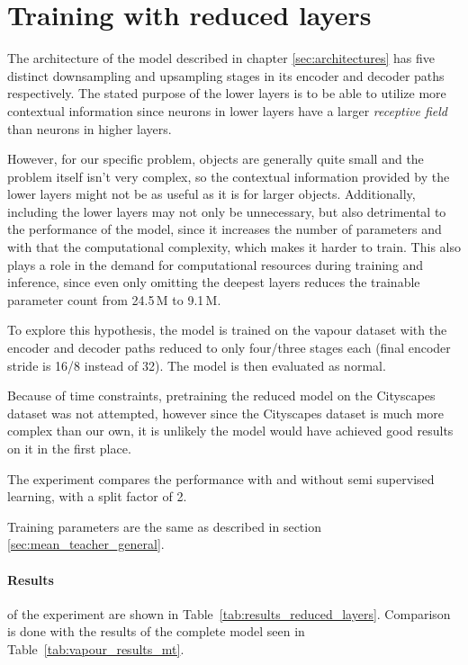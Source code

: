 \section{Training with reduced layers}
\label{sec:reduced_layers}

The architecture of the model described in chapter \ref{sec:architectures} has five distinct downsampling and upsampling stages in its encoder and decoder paths respectively.
The stated purpose of the lower layers is to be able to utilize more contextual information since neurons in lower layers have a larger \emph{receptive field} than neurons in higher layers.

However, for our specific problem, objects are generally quite small  and the problem itself isn't very complex, so the contextual information provided by the lower layers might not be as useful as it is for larger objects.
Additionally, including the lower layers may not only be unnecessary, but also detrimental to the performance of the model, since it increases the number of parameters and with that the computational complexity, which makes it harder to train. 
This also plays a role in the demand for computational resources during training and inference, since even only omitting the deepest layers reduces the trainable parameter count from 24.5\,M to 9.1\,M.

To explore this hypothesis, the model is trained on the vapour dataset with the encoder and decoder paths reduced to only four/three stages each (final encoder stride is 16/8 instead of 32). The model is then evaluated as normal.

Because of time constraints, pretraining the reduced model on the Cityscapes dataset was not attempted, however since the Cityscapes dataset is much more complex than our own, it is unlikely the model would have achieved good results on it in the first place.

The experiment compares the performance with and without semi supervised learning, with a split factor of 2.

Training parameters are the same as described in section \ref{sec:mean_teacher_general}.

\paragraph{Results} of the experiment are shown in Table~\ref{tab:results_reduced_layers}. Comparison is done with the results of the complete model seen in Table~\ref{tab:vapour_results_mt}.

